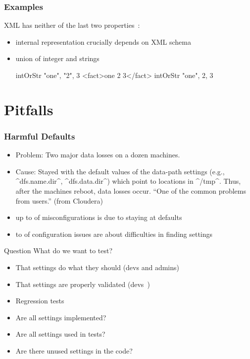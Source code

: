 \begin{frame}[fragile]
	\frametitle{Examples}

	XML has neither of the last two properties~\citet{wadler2003xml}:

	\begin{itemize} %
	\item internal representation crucially depends on XML schema
	\item union of integer and strings
	\begin{code}[gobble=4]
	intOrStr { "one", "2", 3 }
	<fact>one 2 3</fact>
	intOrStr { "one",  2,  3 }
	\end{code}

	\end{itemize}
\end{frame}



\section{Pitfalls}

\begin{frame}[fragile]
	\frametitle{Harmful Defaults~\cite{xu2015hey}}
	\begin{itemize}
	\item Problem: Two major data losses on a dozen machines.
	\item Cause:
	Stayed with the default values of the data-path settings
	(e.g., ^dfs.name.dir^, ^dfs.data.dir^) which point to locations in ^/tmp^.
	Thus, after the machines reboot, data losses occur.
	``One of the common problems from users.'' (from Cloudera)
	\item up to  of misconfigurations is due to staying at defaults
	\item {} to  of configuration issues are about difficulties in finding settings
	\end{itemize}
\end{frame}

\begin{frame}
	\begin{alertblock}{Question}
	What do we want to test?
	\end{alertblock}

	\pause
	\begin{itemize}
	\item That settings do what they should (devs and admins)
	\item That settings are properly validated (devs~\cite{xu2013blame})
	\item Regression tests~\cite{qu2008configuration}
	\pause
	\vspace{1em}
	\item Are all settings implemented?
	\item Are all settings used in tests?
	\item Are there unused settings in the code?
	\end{itemize}
\end{frame}


